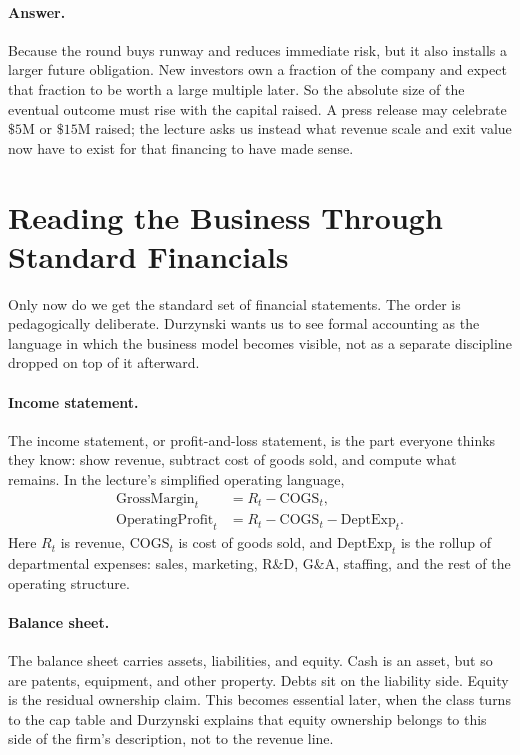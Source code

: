 \paragraph{Answer.}
Because the round buys runway and reduces immediate risk, but it also installs a larger future obligation. New investors own a fraction of the company and expect that fraction to be worth a large multiple later. So the absolute size of the eventual outcome must rise with the capital raised. A press release may celebrate \(\$5\text{M}\) or \(\$15\text{M}\) raised; the lecture asks us instead what revenue scale and exit value now have to exist for that financing to have made sense.

\section{Reading the Business Through Standard Financials}

Only now do we get the standard set of financial statements. The order is pedagogically deliberate. Durzynski wants us to see formal accounting as the language in which the business model becomes visible, not as a separate discipline dropped on top of it afterward.

\paragraph{Income statement.}
The income statement, or profit-and-loss statement, is the part everyone thinks they know: show revenue, subtract cost of goods sold, and compute what remains. In the lecture's simplified operating language,
\begin{align}
\mathrm{GrossMargin}_t &= R_t - \mathrm{COGS}_t, \\
\mathrm{OperatingProfit}_t &= R_t - \mathrm{COGS}_t - \mathrm{DeptExp}_t.
\end{align}
Here \(R_t\) is revenue, \(\mathrm{COGS}_t\) is cost of goods sold, and \(\mathrm{DeptExp}_t\) is the rollup of departmental expenses: sales, marketing, R\&D, G\&A, staffing, and the rest of the operating structure.

\paragraph{Balance sheet.}
The balance sheet carries assets, liabilities, and equity. Cash is an asset, but so are patents, equipment, and other property. Debts sit on the liability side. Equity is the residual ownership claim. This becomes essential later, when the class turns to the cap table and Durzynski explains that equity ownership belongs to this side of the firm's description, not to the revenue line.

